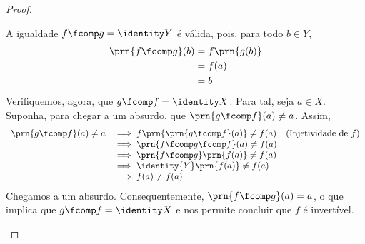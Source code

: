 \begin{proof}
\begin{itemize}
        A igualdade $f \fcomp g = \identity Y$ é válida, pois, para todo $b \in Y$,
        \begin{align*}
            \prn{f \fcomp g}(b) & = f\prn{g(b)} \\ &= f(a) \\ &= b
        \end{align*}
        Verifiquemos, agora, que $g \fcomp f = \identity X$.
        Para tal, seja $a \in X$.
        Suponha, para chegar a um absurdo, que $\prn{g \fcomp f}(a) \ne a$.
        Assim,
        \begin{equation*}
            \begin{array}{rlc}
                \prn{g \fcomp f}(a) \ne a & \implies f\prn{\prn{g \fcomp f}(a)} \ne f(a) & (\text{Injetividade de $f$}) \\
                & \implies \prn{f \fcomp g \fcomp f}(a) \ne f(a) & \\
                & \implies \prn{f \fcomp g}\prn{f(a)} \ne f(a) & \\
                & \implies \identity{Y}\prn{f(a)} \ne f(a) & \\
                & \implies f(a) \ne f(a) &
            \end{array}
        \end{equation*}
        Chegamos a um absurdo.
        Consequentemente, $\prn{f \fcomp g}(a) = a$, o que implica que $g \fcomp f = \identity X$ e nos permite concluir que $f$ é invertível.
        
    \end{itemize}
\end{proof}
